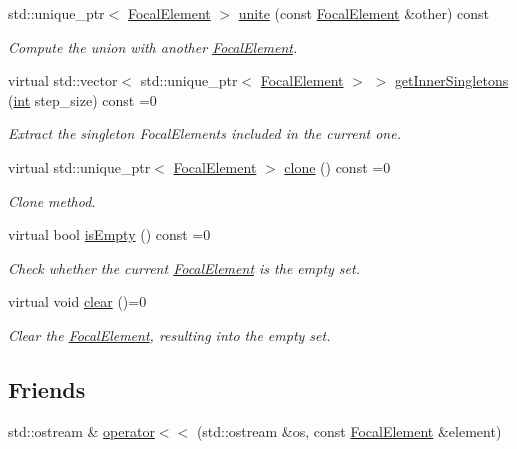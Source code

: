 \begin{DoxyCompactItemize}
std\+::unique\+\_\+ptr$<$ \hyperlink{classFocalElement}{Focal\+Element} $>$ \hyperlink{classFocalElement_a533f16fbd5ae2b3d353d7c9a00bfb2c5}{unite} (const \hyperlink{classFocalElement}{Focal\+Element} \&other) const 
\begin{DoxyCompactList}\small\item\em Compute the union with another \hyperlink{classFocalElement}{Focal\+Element}. \end{DoxyCompactList}\item 
virtual std\+::vector$<$ std\+::unique\+\_\+ptr$<$ \hyperlink{classFocalElement}{Focal\+Element} $>$ $>$ \hyperlink{classFocalElement_ac615e960ea64a4bdc0f442135f6069e2}{get\+Inner\+Singletons} (\hyperlink{CMakeCache_8txt_a79a3d8790b2588b09777910863574e09}{int} step\+\_\+size) const =0
\begin{DoxyCompactList}\small\item\em Extract the singleton Focal\+Elements included in the current one. \end{DoxyCompactList}\item 
virtual std\+::unique\+\_\+ptr$<$ \hyperlink{classFocalElement}{Focal\+Element} $>$ \hyperlink{classFocalElement_a21697fbbbcb144c18fa7b4ecae5e6145}{clone} () const =0
\begin{DoxyCompactList}\small\item\em Clone method. \end{DoxyCompactList}\item 
virtual bool \hyperlink{classFocalElement_aed131a65fdfc885019f9bf8f1d454508}{is\+Empty} () const =0
\begin{DoxyCompactList}\small\item\em Check whether the current \hyperlink{classFocalElement}{Focal\+Element} is the empty set. \end{DoxyCompactList}\item 
virtual void \hyperlink{classFocalElement_a635cb4afffa2dc69cf9fc9ff94a6d90f}{clear} ()=0
\begin{DoxyCompactList}\small\item\em Clear the \hyperlink{classFocalElement}{Focal\+Element}, resulting into the empty set. \end{DoxyCompactList}\end{DoxyCompactItemize}
\subsection*{Friends}
\begin{DoxyCompactItemize}
\item 
std\+::ostream \& \hyperlink{classFocalElement_a437885090fd5a00881653a501a4c70f1}{operator$<$$<$} (std\+::ostream \&os, const \hyperlink{classFocalElement}{Focal\+Element} \&element)
\end{DoxyCompactItemize}


